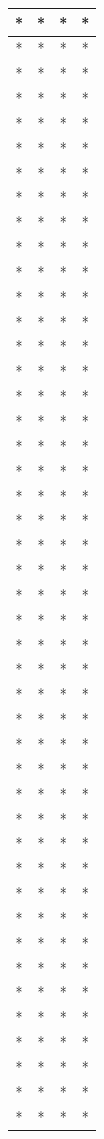 \begin{table}[ht]
\begin{tabular}{|c|c|c|c|}
\hline
* & * & * & * \\
\hline
* & * & * & * \\
\hline
* & * & * & * \\
\hline
* & * & * & * \\
\hline
* & * & * & * \\
\hline
* & * & * & * \\
\hline
* & * & * & * \\
\hline
* & * & * & * \\
\hline
* & * & * & * \\
\hline
* & * & * & * \\
\hline
* & * & * & * \\
\hline
* & * & * & * \\
\hline
* & * & * & * \\
\hline
* & * & * & * \\
\hline
* & * & * & * \\
\hline
* & * & * & * \\
\hline
* & * & * & * \\
\hline
* & * & * & * \\
\hline
* & * & * & * \\
\hline
* & * & * & * \\
\hline
* & * & * & * \\
\hline
* & * & * & * \\
\hline
* & * & * & * \\
\hline
* & * & * & * \\
\hline
* & * & * & * \\
\hline
* & * & * & * \\
\hline
* & * & * & * \\
\hline
* & * & * & * \\
\hline
* & * & * & * \\
\hline
* & * & * & * \\
\hline
* & * & * & * \\
\hline
* & * & * & * \\
\hline
* & * & * & * \\
\hline
* & * & * & * \\
\hline
* & * & * & * \\
\hline
* & * & * & * \\
\hline
* & * & * & * \\
\hline
* & * & * & * \\
\hline
* & * & * & * \\
\hline
* & * & * & * \\
\hline
* & * & * & * \\
\hline
* & * & * & * \\
\hline
* & * & * & * \\
\hline
* & * & * & * \\
\hline
* & * & * & * \\
\hline
\end{tabular}
\end{table}

